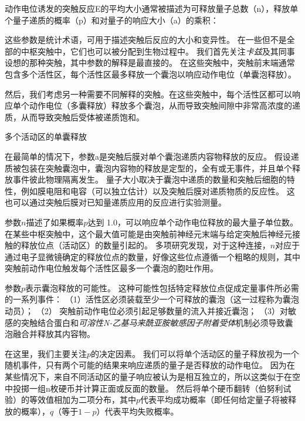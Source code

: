 \begin{proposition}[突触强度取决于递质释放的概率和其他量子参数] \label{box:15_1}
	
	\quad \quad 动作电位诱发的突触反应E的平均大小通常被描述为可释放量子总数（n），释放单个量子递质的概率（p）和对量子的响应大小（a）的乘积：
	
	\quad \quad 这些参数是统计术语，可用于描述突触后反应的大小和变异性。
	在一些但不是全部的中枢突触中，它们也可以被分配到生物过程中。
	我们首先关注\textit{卡兹}及其同事设想的那种突触，其中参数的解释是最直接的。
	在这些突触中，突触前末端通常包含多个活性区，每个活性区最多释放一个囊泡以响应动作电位（单囊泡释放）。
	
	\quad \quad 然后，我们考虑另一种需要不同解释的突触。在这些突触中，每个活性区都可以响应单个动作电位（多囊释放）释放多个囊泡，从而导致突触间隙中非常高浓度的递质，从而导致突触后受体被递质饱和。
	
	\quad \quad 多个活动区的单囊释放
	
	\quad \quad 在最简单的情况下，参数a是突触后膜对单个囊泡递质内容物释放的反应。
	假设递质被包装在突触囊泡中，囊泡内容物的释放是定型的，全有或无事件，并且单个释放事件彼此物理隔离发生。
	量子大小取决于囊泡中递质的数量和突触后细胞的特性，例如膜电阻和电容（可以独立估计）以及突触后膜对递质物质的反应性。
	这也可以通过突触后膜对已知量递质应用的反应进行实验测量。
	
	\quad \quad 参数$ n $描述了如果概率$ p $达到 1.0，可以响应单个动作电位释放的最大量子单位数。
	在某些中枢突触中，这个最大值可能是由突触前神经元末端与给定突触后神经元接触的释放位点（活动区）的数量引起的。
	多项研究发现，对于这种连接，$ n $对应于通过电子显微镜确定的释放位点的数量，好像这些位点遵循一个粗略的规则，其中突触前动作电位触发每个活性区最多一个囊泡的胞吐作用。
	
	\quad \quad 参数$ p $表示囊泡释放的可能性。
	这种可能性包括特定释放位点促成定量事件所必需的一系列事件：
	（1）活性区必须装载至少一个可释放的囊泡（这一过程称为囊泡动员）；
	（2） 突触前动作电位必须引起足够数量的流入并接近囊泡；
	（3）对敏感的突触结合蛋白和\textit{可溶性N-乙基马来酰亚胺敏感因子附着受体}机制必须导致囊泡融合并释放其内容物。
	
	\quad \quad 在这里，我们主要关注$ p $的决定因素。
	我们可以将单个活动区的量子释放视为一个随机事件，只有两个可能的结果来响应递质的量子是否释放的动作电位。
	因为在某些情况下，来自不同活动区的量子响应被认为是相互独立的，所以这类似于在空中投掷一组n枚硬币并计算正面或反面的数量。
	然后将单个硬币翻转（伯努利试验）的等效值相加为二项分布，其中$ p $代表平均成功概率（即任何给定量子将被释放的概率），$ q $（等于$ 1-p $）代表平均失败概率。
	

\end{proposition}
